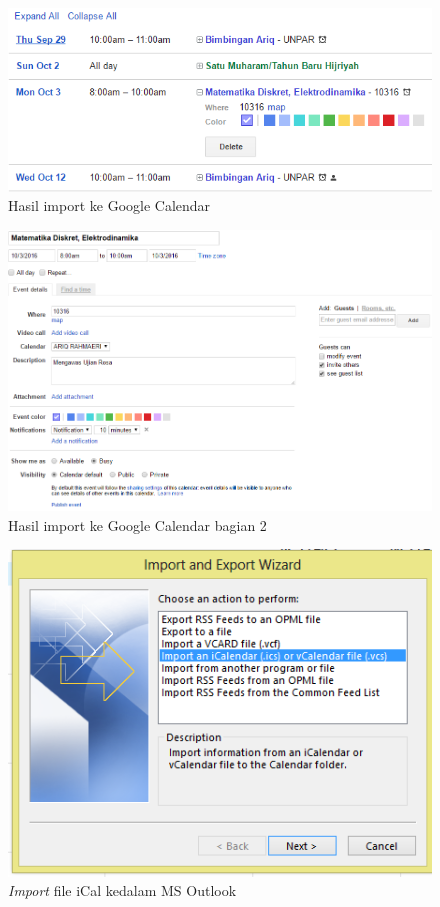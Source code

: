 		\begin{figure}[H]
		\centering
		\includegraphics[scale=0.7]{Gambar/hasilGCEksperimental}
		\caption{Hasil import ke Google Calendar}
		\label{fig:hasilGCEksperimental}
		\end{figure}
		
		\begin{figure}[H]
		\centering
		\includegraphics[scale=0.5]{Gambar/hasilGCEksperimental2}
		\caption{Hasil import ke Google Calendar bagian 2 }
		\label{fig:hasilGCEksperimental2}
		\end{figure}
		
	
			\begin{figure}[H]
			\centering
			\includegraphics[scale=0.8]{Gambar/importOutlook}
			\caption{\textit{Import} file iCal kedalam MS Outlook }
			\label{fig:importOutlook}
			\end{figure}
		

